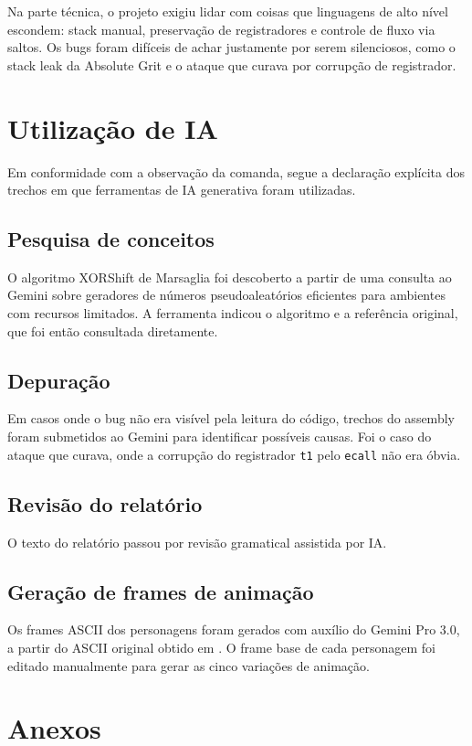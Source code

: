 \documentclass[AMA,twocolumn]{USG}
\begin{document}
Na parte técnica, o projeto exigiu lidar com coisas que linguagens de alto nível escondem: stack manual, preservação de registradores e controle de fluxo via saltos. Os bugs foram difíceis de achar justamente por serem silenciosos, como o stack leak da Absolute Grit e o ataque que curava por corrupção de registrador.

\section{Utilização de IA}

Em conformidade com a observação da comanda, segue a declaração explícita dos trechos em que ferramentas de IA generativa foram utilizadas.

\subsection{Pesquisa de conceitos}
O algoritmo XORShift de Marsaglia foi descoberto a partir de uma consulta ao Gemini sobre geradores de números pseudoaleatórios eficientes para ambientes com recursos limitados. A ferramenta indicou o algoritmo e a referência original, que foi então consultada diretamente.

\subsection{Depuração}
Em casos onde o bug não era visível pela leitura do código, trechos do assembly foram submetidos ao Gemini para identificar possíveis causas. Foi o caso do ataque que curava, onde a corrupção do registrador \texttt{t1} pelo \texttt{ecall} não era óbvia.

\subsection{Revisão do relatório}
O texto do relatório passou por revisão gramatical assistida por IA.

\subsection{Geração de frames de animação}
Os frames ASCII dos personagens foram gerados com auxílio do Gemini Pro 3.0, a partir do ASCII original obtido em \cite{emojicombos_undertale}. O frame base de cada personagem foi editado manualmente para gerar as cinco variações de animação.

\section{Anexos}



\end{document}
